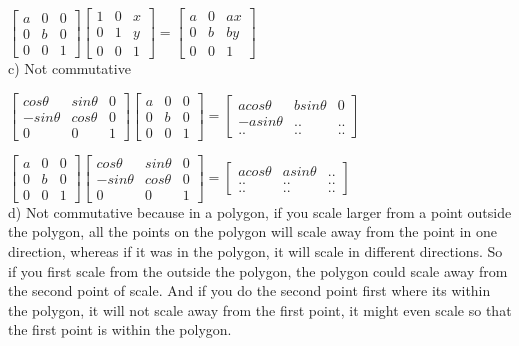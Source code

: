 \documentclass[12pt,a4paper]{article}
\begin{document}
$
\begin{bmatrix}
a&0&0\\
0&b&0\\
0&0&1
\end{bmatrix}
\begin{bmatrix}
1 &0 &x\\
0 &1& y\\
0 &0& 1
\end{bmatrix}
 = \begin{bmatrix}
a&0&ax\\
0&b&by\\
0&0&1
\end{bmatrix}$
\\

c) Not commutative

$\begin{bmatrix}
cos\theta &sin\theta &0\\
-sin\theta &cos\theta& 0\\
0 &0& 1
\end{bmatrix}
\begin{bmatrix}
a&0&0\\
0&b&0\\
0&0&1
\end{bmatrix} = \begin{bmatrix}
acos\theta&bsin\theta&0\\
-a sin\theta&..&..\\
..&..&..
\end{bmatrix}$

$
\begin{bmatrix}
a&0&0\\
0&b&0\\
0&0&1
\end{bmatrix}
\begin{bmatrix}
cos\theta &sin\theta &0\\
-sin\theta &cos\theta& 0\\
0 &0& 1
\end{bmatrix}
 = \begin{bmatrix}
acos\theta&asin\theta&..\\
..&..&..\\
..&..&..
\end{bmatrix}$
\\

d) Not commutative because in a polygon, if you scale larger from a point outside the polygon, all the points on the polygon will scale away from the point in one direction, whereas if it was in the polygon, it will scale in different directions. So if you first scale from the outside the polygon, the polygon could scale away from the second point of scale. And if you do the second point first where its within the polygon, it will not scale away from the first point, it might even scale so that the first point is within the polygon. 
\\
\pagebreak
\end{document}
